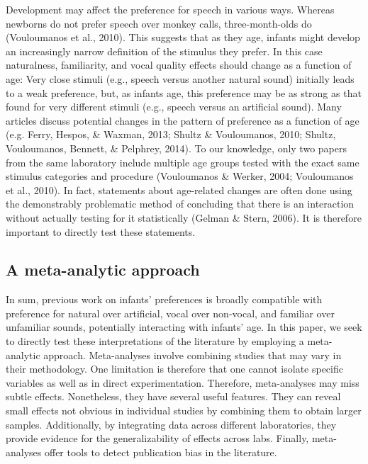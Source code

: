 \documentclass[man]{apa6}
\begin{document}
Development may affect the preference for speech in various ways.
Whereas newborns do not prefer speech over monkey calls,
three-month-olds do (Vouloumanos et al., 2010). This suggests that as
they age, infants might develop an increasingly narrow definition of the
stimulus they prefer. In this case naturalness, familiarity, and vocal
quality effects should change as a function of age: Very close stimuli
(e.g., speech versus another natural sound) initially leads to a weak
preference, but, as infants age, this preference may be as strong as
that found for very different stimuli (e.g., speech versus an artificial
sound). Many articles discuss potential changes in the pattern of
preference as a function of age (e.g. Ferry, Hespos, \& Waxman, 2013;
Shultz \& Vouloumanos, 2010; Shultz, Vouloumanos, Bennett, \& Pelphrey,
2014). To our knowledge, only two papers from the same laboratory
include multiple age groups tested with the exact same stimulus
categories and procedure (Vouloumanos \& Werker, 2004; Vouloumanos et
al., 2010). In fact, statements about age-related changes are often done
using the demonstrably problematic method of concluding that there is an
interaction without actually testing for it statistically (Gelman \&
Stern, 2006). It is therefore important to directly test these
statements.

\subsection{A meta-analytic approach}\label{a-meta-analytic-approach}

In sum, previous work on infants' preferences is broadly compatible with
preference for natural over artificial, vocal over non-vocal, and
familiar over unfamiliar sounds, potentially interacting with infants'
age. In this paper, we seek to directly test these interpretations of
the literature by employing a meta-analytic approach. Meta-analyses
involve combining studies that may vary in their methodology. One
limitation is therefore that one cannot isolate specific variables as
well as in direct experimentation. Therefore, meta-analyses may miss
subtle effects. Nonetheless, they have several useful features. They can
reveal small effects not obvious in individual studies by combining them
to obtain larger samples. Additionally, by integrating data across
different laboratories, they provide evidence for the generalizability
of effects across labs. Finally, meta-analyses offer tools to detect
publication bias in the literature.
\end{document}
